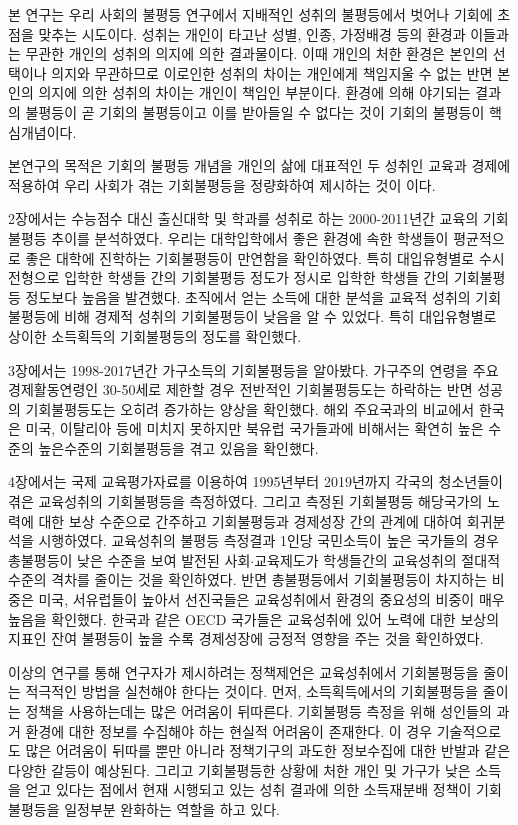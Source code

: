 본 연구는 우리 사회의 불평등 연구에서 지배적인 성취의 불평등에서 벗어나 기회에 초점을 맞추는 시도이다.
성취는 개인이 타고난 성별, 인종, 가정배경 등의 환경과 이들과는 무관한 개인의 성취의 의지에 의한 결과물이다.
 이때 개인의 처한 환경은 본인의 선택이나 의지와 무관하므로 이로인한 성취의 차이는 개인에게 책임지울 수 없는 반면 본인의 의지에 의한 성취의 차이는 개인이 책임인 부분이다.
 환경에 의해 야기되는 결과의 불평등이 곧 기회의 불평등이고 이를 받아들일 수 없다는 것이 기회의 불평등이 핵심개념이다.

본연구의 목적은 기회의 불평등 개념을 개인의 삶에 대표적인 두 성취인 교육과 경제에 적용하여 우리 사회가 겪는 기회불평등을 정량화하여 제시하는 것이 이다.

2장에서는 수능점수 대신 출신대학 및 학과를 성취로 하는 2000-2011년간 교육의 기회불평등 추이를 분석하였다.
 우리는 대학입학에서 좋은 환경에 속한 학생들이 평균적으로 좋은 대학에 진학하는 기회불평등이 만연함을 확인하였다.
 특히 대입유형별로 수시전형으로 입학한 학생들 간의 기회불평등 정도가 정시로 입학한 학생들 간의 기회불평등 정도보다 높음을 발견했다.
 초직에서 얻는 소득에 대한 분석을 교육적 성취의 기회불평등에 비해 경제적 성취의 기회불평등이 낮음을 알 수 있었다.
 특히 대입유형별로 상이한 소득획득의 기회불평등의 정도를 확인했다.

3장에서는 1998-2017년간 가구소득의 기회불평등을 알아봤다.
 가구주의 연령을 주요 경제활동연령인 30-50세로 제한할 경우 전반적인 기회불평등도는 하락하는 반면 성공의 기회불평등도는 오히려 증가하는 양상을 확인했다.
 해외 주요국과의 비교에서 한국은 미국, 이탈리아 등에 미치지 못하지만 북유럽 국가들과에 비해서는 확연히 높은 수준의 높은수준의 기회불평등을 겪고 있음을 확인했다.

4장에서는 국제 교육평가자료를 이용하여 1995년부터 2019년까지 각국의 청소년들이 겪은 교육성취의 기회불평등을 측정하였다.
 그리고 측정된 기회불평등 해당국가의 노력에 대한 보상 수준으로 간주하고 기회불평등과 경제성장 간의 관계에 대하여 회귀분석을 시행하였다.
 교육성취의 불평등 측정결과 1인당 국민소득이 높은 국가들의 경우 총불평등이 낮은 수준을 보여 발전된 사회$\cdot$교육제도가 학생들간의 교육성취의 절대적 수준의 격차를 줄이는 것을 확인하였다.
 반면 총불평등에서 기회불평등이 차지하는 비중은 미국, 서유럽들이 높아서 선진국들은 교육성취에서 환경의 중요성의 비중이 매우 높음을 확인했다. 
 한국과 같은 OECD 국가들은 교육성취에 있어 노력에 대한 보상의 지표인 잔여 불평등이 높을 수록 경제성장에 긍정적 영향을 주는 것을 확인하였다.
 
이상의 연구를 통해 연구자가 제시하려는 정책제언은 교육성취에서 기회불평등을 줄이는 적극적인 방법을 실천해야 한다는 것이다.
먼저, 소득획득에서의 기회불평등을 줄이는 정책을 사용하는데는 많은 어려움이 뒤따른다.
기회불평등 측정을 위해 성인들의 과거 환경에 대한 정보를 수집해야 하는 현실적 어려움이 존재한다.
이 경우 기술적으로도 많은 어려움이 뒤따를 뿐만 아니라 정책기구의 과도한 정보수집에 대한 반발과 같은 다양한 갈등이 예상된다.
그리고 기회불평등한 상황에 처한 개인 및 가구가 낮은 소득을 얻고 있다는 점에서 현재 시행되고 있는 성취 결과에 의한 소득재분배 정책이 기회불평등을 일정부분 완화하는 역할을 하고 있다.

